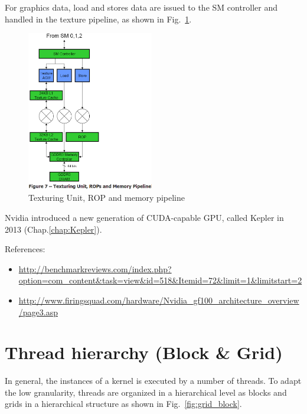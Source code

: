 For graphics data, load and stores data are issued to the SM
controller and handled in the texture pipeline, as shown in
Fig.~\ref{fig:gt200_load.store}.
\begin{figure}[hbt]
  \centerline{\includegraphics[height=7cm,
    angle=0]{./images/gt200_load.store.eps}}
  \caption{Texturing Unit, ROP and memory pipeline}
  \label{fig:gt200_load.store}
\end{figure}

Nvidia introduced a new generation of CUDA-capable GPU, called Kepler in 2013
(Chap.\ref{chap:Kepler}).

References:
\begin{itemize}
\item
  \url{http://benchmarkreviews.com/index.php?option=com_content&task=view&id=518&Itemid=72&limit=1&limitstart=2}

\item
  \url{http://www.firingsquad.com/hardware/Nvidia_gf100_architecture_overview/page3.asp}
\end{itemize}

\section{Thread hierarchy (Block \& Grid)}
\label{sec:block--grid}

In general, the instances of a kernel is executed by a number of
threads. To adapt the low granularity, threads are organized in
a hierarchical level as blocks and grids in a hierarchical structure as shown 
in Fig.~\ref{fig:grid_block}.

